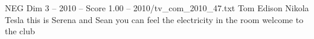 \begin{textsample}{NEG Dim 3 – 2010 – Score 1.00 – 2010/tv\_com\_2010\_47.txt}  \label{ex:f3_neg_055}
Tom Edison Nikola Tesla this is Serena and Sean you can feel the electricity in the room welcome to the club

\end{textsample}
